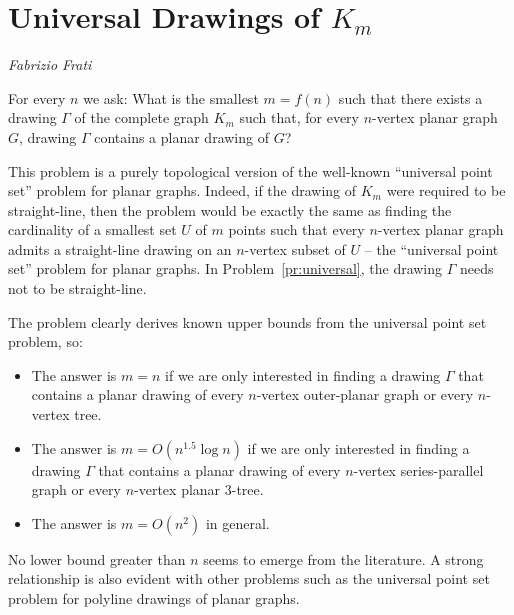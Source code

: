 \documentclass{patmorin}
\begin{document}
%


\section{Universal Drawings of $K_m$}

\noindent\emph{Fabrizio Frati}

\begin{op} \label{pr:universal}
For every $n$ we ask: What is the smallest $m=f(n)$ such that there exists a drawing $\Gamma$ of the complete graph $K_m$ such that, for every $n$-vertex planar graph $G$, drawing $\Gamma$ contains a planar drawing of $G$?
\end{op} 

This problem is a purely topological version of the well-known ``universal point set'' problem for planar graphs. Indeed, if the drawing of $K_m$ were required to be straight-line, then the problem would be exactly the same as finding the cardinality of a smallest set $U$ of $m$ points such that every $n$-vertex planar graph admits a straight-line drawing on an $n$-vertex subset of $U$ -- the ``universal point set'' problem for planar graphs. In Problem~\ref{pr:universal}, the drawing $\Gamma$ needs not to be straight-line.

The problem clearly derives known upper bounds from the universal point set problem, so:

\begin{itemize}
\item The answer is $m=n$ if we are only interested in finding a drawing $\Gamma$ that contains a planar drawing of every $n$-vertex outer-planar graph or every $n$-vertex tree.
\item The answer is $m=O(n^{1.5}\log n)$ if we are only interested in finding a drawing $\Gamma$ that contains a planar drawing of every $n$-vertex series-parallel graph or every $n$-vertex planar $3$-tree.
\item The answer is $m=O(n^2)$ in general.
\end{itemize}

No lower bound greater than $n$ seems to emerge from the literature. A strong relationship is also evident with other problems such as the universal point set problem for polyline drawings of planar graphs.
\end{document}
